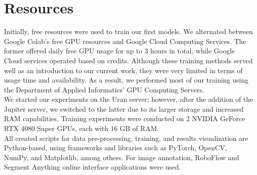 \section{Resources}\label{ch:resources}

Initially, free resources were used to train our first models. We alternated between Google Colab's free GPU resources and Google Cloud Computing Services. The former offered daily free GPU usage for up to 3 hours in total, while Google Cloud services operated based on credits. Although these training methods served well as an introduction to our current work, they were very limited in terms of usage time and availability. As a result, we performed most of our training using the Department of Applied Informatics’ GPU Computing Servers.\\

We started our experiments on the Uran server; however, after the addition of the Jupiter server, we switched to the latter due to its larger storage and increased RAM capabilities. Training experiments were conducted on 2 NVIDIA GeForce RTX 4080 Super GPUs, each with 16 GB of RAM.\\

All created scripts for data pre-processing, training, and results visualization are Python-based, using frameworks and libraries such as PyTorch, OpenCV, NumPy, and Matplotlib, among others. For image annotation, RoboFlow and Segment Anything online interface applications were used.